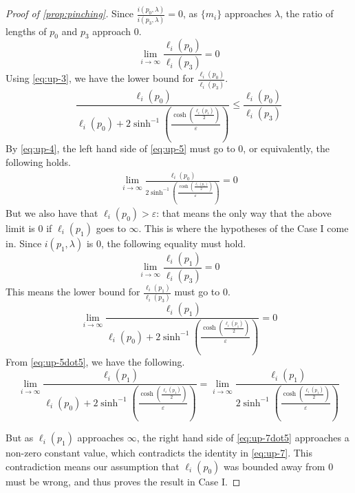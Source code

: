 \begin{proof}[Proof of \autoref{prop:pinching}]
Since $\frac{i(p_0, \lambda)}{i(p_3, \lambda)} = 0$, as $\{m_i\}$ approaches $\lambda$, the ratio of lengths of $p_0$ and $p_3$ approach $0$.
\begin{equation}
  \label{eq:up-4}
  \lim_{i \to \infty} \frac{\ell_i(p_0)}{\ell_i(p_3)} = 0
\end{equation}
Using \eqref{eq:up-3}, we have the lower bound for $\frac{\ell_i(p_0)}{\ell_i(p_3)}$.
\begin{equation}
  \label{eq:up-5}
  \frac{\ell_i(p_0)}{  \ell_i(p_0) +
  2 \sinh^{-1} \left( \frac{\cosh \left( \frac{\ell_i(p_1)}{2} \right)}{\varepsilon} \right)} \leq \frac{\ell_i(p_0)}{\ell_i(p_3)}
\end{equation}
By \eqref{eq:up-4}, the left hand side of \eqref{eq:up-5} must go to $0$, or equivalently, the following holds.
\begin{align}
  \label{eq:up-5dot5}
\lim_{i \to \infty} \frac{\ell_i(p_0)}{2 \sinh^{-1} \left( \frac{\cosh \left( \frac{\ell_i(p_1)}{2} \right)}{\varepsilon} \right)}
= 0
\end{align}
But we also have that $\ell_i(p_0) > \varepsilon$: that means the only way that the above limit is $0$ if $\ell_i(p_1)$ goes to $\infty$.
This is where the hypotheses of the Case I come in.
Since $i(p_1, \lambda)$ is $0$, the following equality must hold.
\begin{equation}
  \label{eq:up-6}
  \lim_{i \to \infty} \frac{\ell_i(p_1)}{\ell_i(p_3)} = 0
\end{equation}
This means the lower bound for $\frac{\ell_i(p_1)}{\ell_i(p_3)}$ must go to $0$.
\begin{equation}
  \label{eq:up-7}
   \lim_{i \to \infty} \frac{\ell_i(p_1)}{  \ell_i(p_0) +
  2 \sinh^{-1} \left( \frac{\cosh \left( \frac{\ell_i(p_1)}{2} \right)}{\varepsilon} \right)
  } = 0
\end{equation}
From \eqref{eq:up-5dot5}, we have the following.
\begin{equation}
  \label{eq:up-7dot5}
  \lim_{i \to \infty} \frac{\ell_i(p_1)}{  \ell_i(p_0) +
  2 \sinh^{-1} \left( \frac{\cosh \left( \frac{\ell_i(p_1)}{2} \right)}{\varepsilon} \right)
  }
  =
  \lim_{i \to \infty} \frac{\ell_i(p_1)}{
  2 \sinh^{-1} \left( \frac{\cosh \left( \frac{\ell_i(p_1)}{2} \right)}{\varepsilon} \right)
  }
\end{equation}

But as $\ell_i(p_1)$ approaches $\infty$, the right hand side of \eqref{eq:up-7dot5} approaches a non-zero constant value, which contradicts the identity in \eqref{eq:up-7}.
This contradiction means our assumption that $\ell_i(p_0)$ was bounded away from $0$ must be wrong, and thus proves the result in Case I.


\end{proof}
